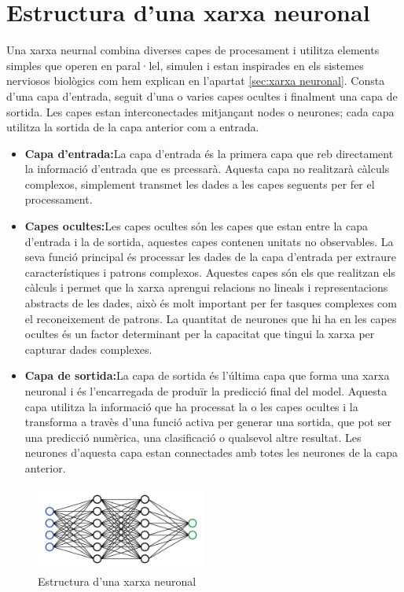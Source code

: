 \section{Estructura d'una xarxa neuronal}\label{sec:3.6}
Una xarxa neurnal combina diverses capes de procesament i utilitza elements simples que operen en paral·lel, simulen i estan inspirades en els sistemes nerviosos biològics com hem explican en l'apartat \ref{sec:xarxa neuronal}. Consta d'una capa d'entrada, seguit d'una o varies capes ocultes i finalment una capa de sortida. Les capes estan interconectades mitjançant nodes o neurones; cada capa utilitza la sortida de la capa anterior com a entrada.

\begin{itemize}
 \item \textbf{Capa d'entrada:}La capa d'entrada és la primera capa que reb directament la informació d'entrada que es prcessarà. Aquesta capa no realitzarà càlculs complexos, simplement transmet les dades a les capes seguents per fer el processament.
 \item \textbf{Capes ocultes:}Les capes ocultes són les capes que estan entre la capa d'entrada i la de sortida, aquestes capes contenen unitats no observables. La seva funció principal és processar les dades de la capa d'entrada per extraure característiques i patrons complexos. Aquestes capes són els que realitzan els càlculs i permet que la xarxa aprengui relacions no lineals i representacions abstracts de les dades, això és molt important per fer tasques complexes com el reconeixement de patrons. La quantitat de neurones que hi ha en les capes ocultes és un factor determinant per la capacitat que tingui la xarxa per capturar dades complexes.
 \item \textbf{Capa de sortida:}La capa de sortida és l'última capa que forma una xarxa neuronal i és l'encarregada de produïr la predicció final del model. Aquesta capa utilitza la informació que ha processat la o les capes ocultes i la transforma a travès d'una funció activa per generar una sortida, que pot ser una predicció numèrica, una clasificació o qualsevol altre resultat. Les neurones d'aquesta capa estan connectades amb totes les neurones de la capa anterior.
 \end{itemize}


\begin{figure}[h!]
    \centering
    \includegraphics[width=0.5\textwidth]{./figures/xarxa.png}
    \caption{Estructura d'una xarxa neuronal}
\end{figure}

